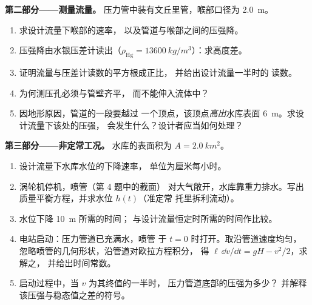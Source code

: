 \begin{problem}
\medskip
\noindent\textbf{第二部分——测量流量。}
压力管中装有文丘里管，喉部口径为 \qty{2.0}{m}。
\begin{enumerate}[resume]
  \item 求设计流量下喉部的速率，
        以及管道与喉部之间的压强降。
  \item 压强降由水银压差计读出（$\rho_{\text{Hg}} =
        \qty{13600}{kg/m^3}$）：求高度差。
  \item 证明流量与压差计读数的平方根成正比，
        并给出设计流量一半时的
        读数。
  \item 为何测压孔必须与管壁齐平，
        而不能伸入流体中？
  \item 因地形原因，管道的一段要越过
        一个顶点，该顶点\emph{高出}水库表面 \qty{6}{m}。求设计流量下该处的压强，
        会发生什么？设计者应当如何处理？
\end{enumerate}

\medskip
\noindent\textbf{第三部分——非定常工况。}
水库的表面积为 $A = \qty{2.0}{km^2}$。
\begin{enumerate}[resume]
  \item 设计流量下水库水位的下降速率，
        单位为厘米每小时。
  \item 涡轮机停机，喷管（第 4 题中的截面）
        对大气敞开，水库靠重力排水。写出
        质量平衡方程，并求水位 $h(t)$（准定常
        托里拆利流动）。
  \item 水位下降 \qty{10}{m} 所需的时间；
        与设计流量恒定时所需的时间作比较。
  \item 电站启动：压力管道已充满水，喷管
        于 $t = 0$ 时打开。取沿管道速度均匀，
        忽略喷管的几何形状，沿管道对欧拉方程积分，
        得 $\ell\,\dd v/\dd t = gH - v^2/2$，求解之，
        并给出时间常数。
  \item 启动过程中，当 $v$ 为其终值的一半时，
        压力管道底部的压强为多少？
        并解释该压强与稳态值之差的符号。
\end{enumerate}


\end{problem}
